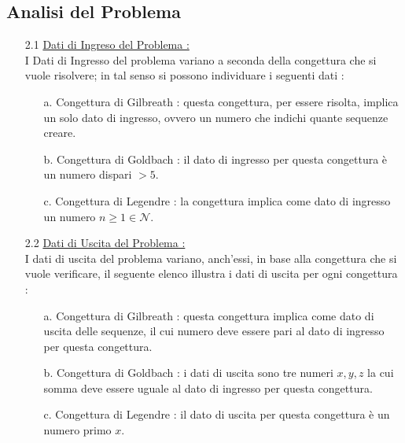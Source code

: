 \documentclass{article}
\begin{document}
\newpage
\begin{center}
    \section{Analisi del Problema}
\end{center}
\begin{enumerate}
    \Large
    \item[2.1] \underline{Dati di Ingreso del Problema :} 
    \large\\I Dati di Ingresso del problema variano a seconda della congettura che si vuole risolvere; in tal senso si possono individuare i seguenti dati : 
    \begin{enumerate}
        \item[a.] Congettura di Gilbreath : questa congettura, per essere risolta, implica un solo dato di ingresso, ovvero un numero che indichi quante sequenze creare.
        \item[b.] Congettura di Goldbach : il dato di ingresso per questa congettura è un numero dispari \begin{math} > 5\end{math}.
        \item[c.] Congettura di Legendre : la congettura implica come dato di ingresso un numero \begin{math} n \geq 1 \in \mathcal{N}\end{math}.
    \end{enumerate}
    \Large\item[2.2] \underline{Dati di Uscita del Problema : }
    \large \\I dati di uscita del problema variano, anch'essi, in base alla congettura che si vuole verificare, il seguente elenco illustra i dati di uscita per ogni congettura : 
    \begin{enumerate}
        \item[a.] Congettura di Gilbreath : questa congettura implica come dato di uscita delle sequenze, il cui numero deve essere pari al dato di ingresso per questa congettura. 
        \item[b.] Congettura di Goldbach : i dati di uscita sono tre numeri \begin{math} x, y, z\end{math} la cui somma deve essere uguale al dato di ingresso per questa congettura.
        \item[c.] Congettura di Legendre : il dato di uscita per questa congettura è un numero primo \begin{math} x\end{math}.

\end{enumerate}
\end{enumerate}
\end{document}
